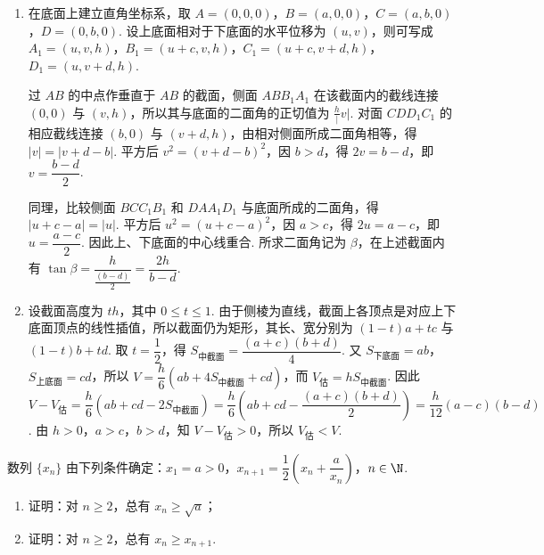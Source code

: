 \begin{solution}
\begin{enumerate}
\item 在底面上建立直角坐标系，取
\(A=(0,0,0)\)，\(B=(a,0,0)\)，\(C=(a,b,0)\)，\(D=(0,b,0)\). 设上底面相对于下底面的水平位移为 \((u,v)\)，则可写成
\(A_1=(u,v,h)\)，\(B_1=(u+c,v,h)\)，\(C_1=(u+c,v+d,h)\)，\(D_1=(u,v+d,h)\).

过 \(AB\) 的中点作垂直于 \(AB\) 的截面，侧面 \(ABB_1A_1\) 在该截面内的截线连接 \((0,0)\) 与 \((v,h)\)，所以其与底面的二面角的正切值为 \(\frac{h}{\lvert} v\rvert\). 对面 \(CDD_1C_1\) 的相应截线连接 \((b,0)\) 与 \((v+d,h)\)，由相对侧面所成二面角相等，得 \(\lvert v\rvert=\lvert v+d-b\rvert\). 平方后 \(v^2=(v+d-b)^2\)，因 \(b>d\)，得 \(2v=b-d\)，即 \(v=\dfrac{b-d}{2}\).

同理，比较侧面 \(BCC_1B_1\) 和 \(DAA_1D_1\) 与底面所成的二面角，得 \(\lvert u+c-a\rvert=\lvert u\rvert\). 平方后 \(u^2=(u+c-a)^2\)，因 \(a>c\)，得 \(2u=a-c\)，即 \(u=\dfrac{a-c}{2}\). 因此上、下底面的中心线重合. 所求二面角记为 \(\beta\)，在上述截面内有
\(\tan\beta=\dfrac{h}{\frac{(b-d)}{2}}=\dfrac{2h}{b-d}\).

\item 设截面高度为 \(th\)，其中 \(0\leqslant t\leqslant1\). 由于侧棱为直线，截面上各顶点是对应上下底面顶点的线性插值，所以截面仍为矩形，其长、宽分别为 \((1-t)a+tc\) 与 \((1-t)b+td\). 取 \(t=\dfrac{1}{2}\)，得
\(S_{\text{中截面}}=\dfrac{(a+c)(b+d)}{4}\). 又 \(S_{\text{下底面}}=ab\)，\(S_{\text{上底面}}=cd\)，所以
\(V=\dfrac{h}{6}\left(ab+4S_{\text{中截面}}+cd\right)\)，而 \(V_{\text{估}}=hS_{\text{中截面}}\). 因此
\(V-V_{\text{估}}=\dfrac{h}{6}\left(ab+cd-2S_{\text{中截面}}\right)=\dfrac{h}{6}\left(ab+cd-\dfrac{(a+c)(b+d)}{2}\right)=\dfrac{h}{12}(a-c)(b-d)\). 由 \(h>0\)，\(a>c\)，\(b>d\)，知 \(V-V_{\text{估}}>0\)，所以 \(V_{\text{估}}<V\).
\end{enumerate}
\end{solution}

\begin{problem}
数列 \(\{x_n\}\) 由下列条件确定：\(x_{1}=a>0\)，\(x_{n+1}=\dfrac{1}{2}\left(x_{n}+\dfrac{a}{x_{n}}\right)\)，\(n\in\N\).

\begin{enumerate}
\item 证明：对 \(n\geqslant 2\)，总有 \(x_{n}\geqslant \sqrt{a}\)；
\item 证明：对 \(n\geqslant 2\)，总有 \(x_{n}\geqslant x_{n+1}\).
\end{enumerate}
\end{problem}

